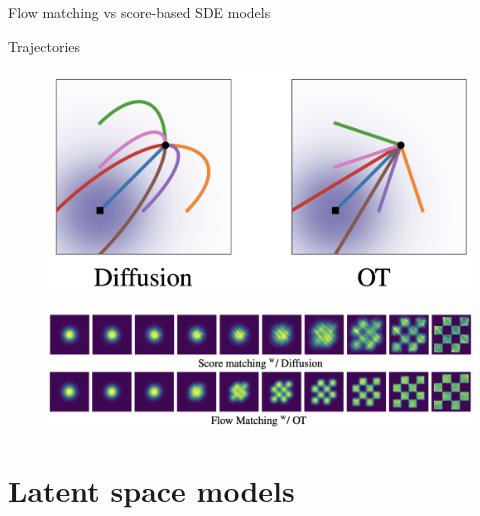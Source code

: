 \begin{frame}{Flow matching vs score-based SDE models}
	\begin{block}{Trajectories}
		\vspace{-0.3cm}
		\begin{figure}
			\centering
			\includegraphics[width=0.6\linewidth]{figs/trajectories}
		\end{figure}
		\vspace{-0.3cm}
	\end{block}
	\begin{figure}
		\centering
		\includegraphics[width=\linewidth]{figs/2d-generation}
	\end{figure}
\end{frame}
\section{Latent space models}
